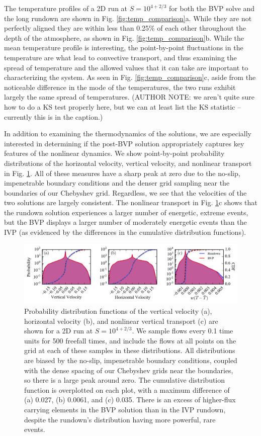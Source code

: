 \documentclass[aps, pre, onecolumn, nofootinbib, notitlepage, groupedaddress, amsfonts, amssymb, amsmath, longbibliography]{revtex4-1}
\begin{document}
The temperature profiles of a 2D run at $S = 10^{4 + 2/3}$ 
for both the BVP solve and the long rundown are shown in
Fig. \ref{fig:temp_comparison}a.  While they are not perfectly aligned they are within less than
0.25\% of each other throughout the depth of the atmosphere, as shown in Fig. \ref{fig:temp_comparison}b.
While the mean temperature profile is interesting, the point-by-point fluctuations in the
temperature are what lead to convective transport, and thus examining the spread of temperature
and the allowed values that it can take are important to characterizing the system.  As seen
in Fig. \ref{fig:temp_comparison}c, aside from the noticeable difference in the mode of the
temperatures, the two runs exhibit largely the same spread of temperatures.
(AUTHOR NOTE: we aren't quite sure how to do a KS test properly here, but we can at least
list the KS statistic -- currently this is in the caption.)

In addition to examining the thermodynamics of the solutions, we are especially interested in
determining if the post-BVP solution appropriately captures key features of the nonlinear dynamics.
We show point-by-point probability distributions of the horizontal velocity, vertical velocity,
and nonlinear transport in Fig. \ref{fig:pdf_comparison}.  All of these measures have a sharp
peak at zero due to the no-slip, impenetrable boundary conditions and the denser grid sampling
near the boundaries of our Chebyshev grid.  Regardless, we see that the velocities of the 
two solutions are largely consistent.  The nonlinear transport in Fig. \ref{fig:pdf_comparison}c
shows that the rundown solution experiences a larger number of energetic, extreme events,
but the BVP displays a larger number of moderately energetic events than the IVP (as
evidenced by the differences in the cumulative distribution functions).

\begin{figure}[b]
\includegraphics[width=\textwidth]{./figs/pdf_comparison.png}
\caption{Probability distribution functions of the vertical velocity (a), horizontal velocity (b), and nonlinear
vertical transport (c) are shown for a 2D run at $S = 10^{4 + 2/3}$.  We sample flows every 0.1 time units for 500 freefall
times, and include the flows at all points on the grid at each of these samples in these distributions.  All
distributions are biased by the no-slip, impenetrable boundary conditions, coupled with the dense spacing of our
Chebyshev grids near the boundaries, so there is a large peak around zero. 
The cumulative distribution function is overplotted on each plot, with a maximum difference of
(a) 0.027, (b) 0.0061, and (c) 0.035. There is an excess of higher-flux carrying
elements in the BVP solution than in the IVP rundown, despite the rundown's distribution
having more powerful, rare events.
\label{fig:pdf_comparison} }
\end{figure}
\end{document}
